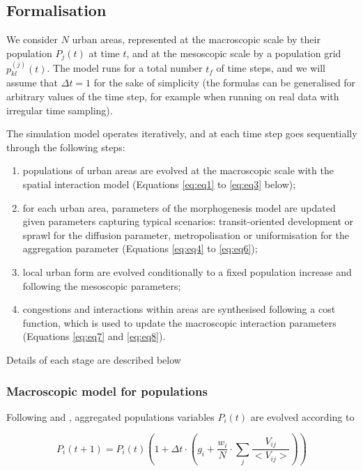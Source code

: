 \documentclass[referee,lineno,pdflatex,sn-apa]{sn-jnl}
\begin{document}
\subsection{Formalisation}


We consider $N$ urban areas, represented at the macroscopic scale by their population $P_j(t)$ at time $t$, and at the mesoscopic scale by a population grid $p_{kl}^{(j)}(t)$. The model runs for a total number $t_f$ of time steps, and we will assume that $\Delta t = 1$ for the sake of simplicity (the formulas can be generalised for arbitrary values of the time step, for example when running on real data with irregular time sampling).

The simulation model operates iteratively, and at each time step goes sequentially through the following steps:
\begin{enumerate}
	\item populations of urban areas are evolved at the macroscopic scale with the spatial interaction model (Equations \ref{eq:eq1} to \ref{eq:eq3} below);
	\item for each urban area, parameters of the morphogenesis model are updated given parameters capturing typical scenarios: transit-oriented development or sprawl for the diffusion parameter, metropolisation or uniformisation for the aggregation parameter (Equations \ref{eq:eq4} to \ref{eq:eq6});
	\item local urban form are evolved conditionally to a fixed population increase and following the mesoscopic parameters;
	\item congestions and interactions within areas are synthesised following a cost function, which is used to update the macroscopic interaction parameters (Equations \ref{eq:eq7} and \ref{eq:eq8}).
\end{enumerate}

Details of each stage are described below
 

\subsubsection{Macroscopic model for populations}

Following \cite{raimbault2020indirect} and \cite{favaro2011gibrat}, aggregated populations variables $P_i(t)$ are evolved according to
	
\begin{equation}
	\label{eq:eq1}
		P_i(t+1) = P_i(t) \left(1 + \Delta t \cdot \left(g_i + \frac{w_i}{N} \cdot \sum_j \frac{V_{ij}}{<V_{ij}>} \right) \right)
\end{equation}
	
\end{document}
